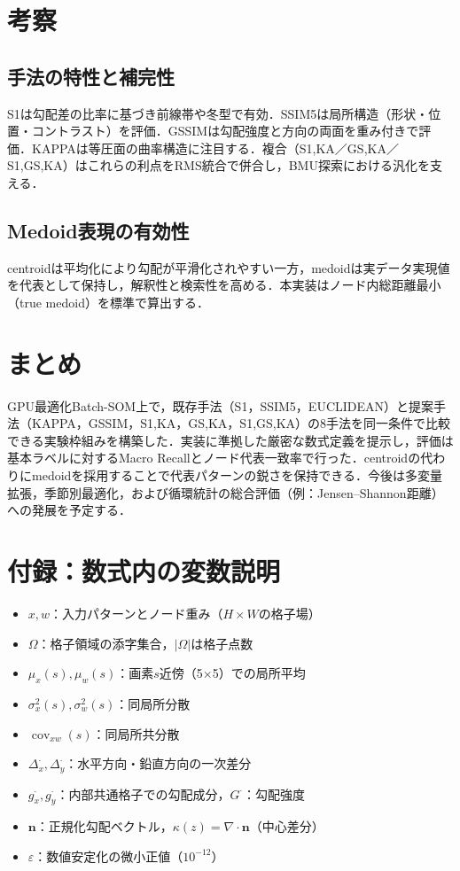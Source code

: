 \documentclass{jarticle}
\theoremstyle{definition}
\begin{document}
\section{考察}
\subsection{手法の特性と補完性}
S1は勾配差の比率に基づき前線帯や冬型で有効．SSIM5は局所構造（形状・位置・コントラスト）を評価．GSSIMは勾配強度と方向の両面を重み付きで評価．KAPPAは等圧面の曲率構造に注目する．複合（S1,KA／GS,KA／S1,GS,KA）はこれらの利点をRMS統合で併合し，BMU探索における汎化を支える．

\subsection{Medoid表現の有効性}
centroidは平均化により勾配が平滑化されやすい一方，medoidは実データ実現値を代表として保持し，解釈性と検索性を高める．本実装はノード内総距離最小（true medoid）を標準で算出する．

\section{まとめ}
GPU最適化Batch-SOM上で，既存手法（S1，SSIM5，EUCLIDEAN）と提案手法（KAPPA，GSSIM，S1,KA，GS,KA，S1,GS,KA）の8手法を同一条件で比較できる実験枠組みを構築した．実装に準拠した厳密な数式定義を提示し，評価は基本ラベルに対するMacro Recallとノード代表一致率で行った．centroidの代わりにmedoidを採用することで代表パターンの鋭さを保持できる．今後は多変量拡張，季節別最適化，および循環統計の総合評価（例：Jensen–Shannon距離）への発展を予定する．

\section*{付録：数式内の変数説明}
\begin{itemize}
\item $x,w$：入力パターンとノード重み（$H\times W$の格子場）
\item $\Omega$：格子領域の添字集合，$|\Omega|$は格子点数
\item $\mu_x(s),\mu_w(s)$：画素$s$近傍（5×5）での局所平均
\item $\sigma_x^2(s),\sigma_w^2(s)$：同局所分散
\item $\operatorname{cov}_{xw}(s)$：同局所共分散
\item $\Delta_x^\cdot,\Delta_y^\cdot$：水平方向・鉛直方向の一次差分
\item $g_x^\cdot,g_y^\cdot$：内部共通格子での勾配成分，$G^\cdot$：勾配強度
\item $\bm{n}$：正規化勾配ベクトル，$\kappa(z)=\nabla\cdot\bm{n}$（中心差分）
\item $\varepsilon$：数値安定化の微小正値（$10^{-12}$）
\end{itemize}



\end{document}

